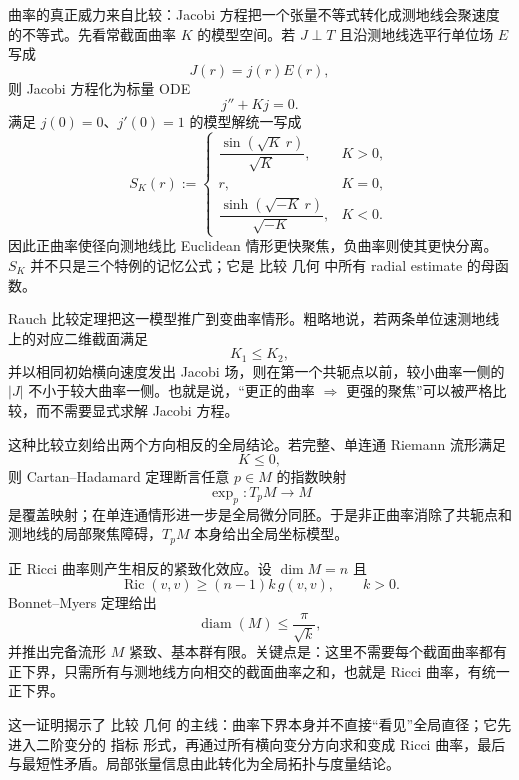 曲率的真正威力来自比较：Jacobi 方程把一个张量不等式转化成测地线会聚速度的不等式。先看常截面曲率 $K$ 的模型空间。若 $J\perp T$ 且沿测地线选平行单位场 $E$ 写成
\[
J(r)=j(r)E(r),
\]
则 Jacobi 方程化为标量 ODE
\[
j''+Kj=0.
\]
满足 $j(0)=0$、$j'(0)=1$ 的模型解统一写成
\begin{equation}
S_K(r)
:=
\begin{cases}
\dfrac{\sin(\sqrt K\,r)}{\sqrt K},&K>0,\\[7pt]
r,&K=0,\\[5pt]
\dfrac{\sinh(\sqrt{-K}\,r)}{\sqrt{-K}},&K<0.
\end{cases}
\label{eq:math-dg-model-jacobi}
\end{equation}
因此正曲率使径向测地线比 Euclidean 情形更快聚焦，负曲率则使其更快分离。$S_K$ 并不只是三个特例的记忆公式；它是 比较 几何 中所有 radial estimate 的母函数。

Rauch 比较定理把这一模型推广到变曲率情形。粗略地说，若两条单位速测地线上的对应二维截面满足
\[
K_1\le K_2,
\]
并以相同初始横向速度发出 Jacobi 场，则在第一个共轭点以前，较小曲率一侧的 $|J|$ 不小于较大曲率一侧。也就是说，``更正的曲率 $\Rightarrow$ 更强的聚焦''可以被严格比较，而不需要显式求解 Jacobi 方程。

这种比较立刻给出两个方向相反的全局结论。若完整、单连通 Riemann 流形满足
\[
K\le0,
\]
则 Cartan--Hadamard 定理断言任意 $p\in M$ 的指数映射
\[
\exp_p:T_pM\to M
\]
是覆盖映射；在单连通情形进一步是全局微分同胚。于是非正曲率消除了共轭点和测地线的局部聚焦障碍，$T_pM$ 本身给出全局坐标模型。

正 Ricci 曲率则产生相反的紧致化效应。设 $\dim M=n$ 且
\begin{equation*}\operatorname{Ric}(v,v)
\ge (n-1)k\,g(v,v),
\qquad k>0.\end{equation*}
Bonnet--Myers 定理给出
\begin{equation}
\boxed{
\operatorname{diam}(M)
\le\frac{\pi}{\sqrt k}
},
\label{eq:math-dg-bonnet-myers-diameter}
\end{equation}
并推出完备流形 $M$ 紧致、基本群有限。关键点是：这里不需要每个截面曲率都有正下界，只需所有与测地线方向相交的截面曲率之和，也就是 Ricci 曲率，有统一正下界。

这一证明揭示了 比较 几何 的主线：曲率下界本身并不直接``看见''全局直径；它先进入二阶变分的 指标 形式，再通过所有横向变分方向求和变成 Ricci 曲率，最后与最短性矛盾。局部张量信息由此转化为全局拓扑与度量结论。

